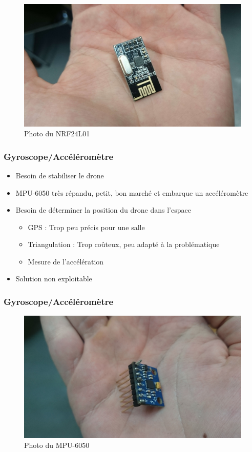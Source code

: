 \documentclass{beamer}
\begin{document}
{\begin{frame}
	  \begin{figure}[htbp]
	    \centering
	    \includegraphics[scale=0.05]{img/nrf24l01.jpg}
	    \caption{Photo du NRF24L01}
	  \end{figure} 
	\end{frame}
	
	\begin{frame} %
	  \frametitle{Gyroscope/Accéléromètre}
	
	  \begin{itemize}
	    \item Besoin de stabiliser le drone
	    \item MPU-6050 très répandu, petit, bon marché et embarque un 
accéléromètre
	    \item Besoin de déterminer la position du drone dans l'espace
	    \begin{itemize}
	      \item GPS : Trop peu précis pour une salle
	      \item Triangulation : Trop coûteux, peu adapté à la problématique
	      \item Mesure de l'accélération
	    \end{itemize}
	    \item Solution non exploitable
	  \end{itemize}
	\end{frame}
	
	\begin{frame}
	  \frametitle{Gyroscope/Accéléromètre}
	
	  \begin{figure}[htbp]
	    \centering
	    \includegraphics[scale=0.05]{img/mpu6050.jpg}
	    \caption{Photo du MPU-6050}
	  \end{figure} 
	\end{frame}
	
}
\end{document}
